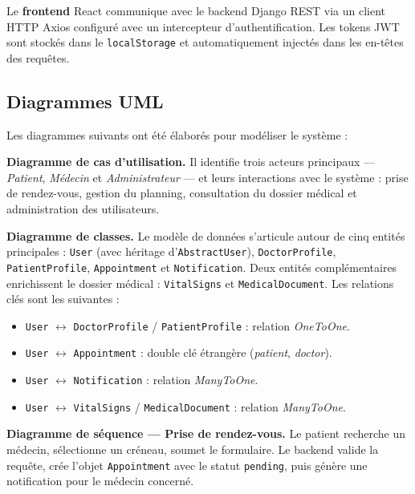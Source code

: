 \documentclass[12pt, a4paper]{article}
\begin{document}
Le \textbf{frontend} React communique avec le backend Django REST via un client HTTP Axios configuré avec un intercepteur d'authentification. Les tokens JWT sont stockés dans le \texttt{localStorage} et automatiquement injectés dans les en-têtes des requêtes.

\subsection{Diagrammes UML}

Les diagrammes suivants ont été élaborés pour modéliser le système :

\textbf{Diagramme de cas d'utilisation.} Il identifie trois acteurs principaux — \textit{Patient}, \textit{Médecin} et \textit{Administrateur} — et leurs interactions avec le système : prise de rendez-vous, gestion du planning, consultation du dossier médical et administration des utilisateurs.

\textbf{Diagramme de classes.} Le modèle de données s'articule autour de cinq entités principales : \texttt{User} (avec héritage d'\texttt{AbstractUser}), \texttt{DoctorProfile}, \texttt{PatientProfile}, \texttt{Appointment} et \texttt{Notification}. Deux entités complémentaires enrichissent le dossier médical : \texttt{VitalSigns} et \texttt{MedicalDocument}. Les relations clés sont les suivantes :

\begin{itemize}[nosep]
  \item \texttt{User} $\longleftrightarrow$ \texttt{DoctorProfile} / \texttt{PatientProfile} : relation \textit{OneToOne}.
  \item \texttt{User} $\longleftrightarrow$ \texttt{Appointment} : double clé étrangère (\textit{patient}, \textit{doctor}).
  \item \texttt{User} $\longleftrightarrow$ \texttt{Notification} : relation \textit{ManyToOne}.
  \item \texttt{User} $\longleftrightarrow$ \texttt{VitalSigns} / \texttt{MedicalDocument} : relation \textit{ManyToOne}.
\end{itemize}

\textbf{Diagramme de séquence — Prise de rendez-vous.} Le patient recherche un médecin, sélectionne un créneau, soumet le formulaire. Le backend valide la requête, crée l'objet \texttt{Appointment} avec le statut \texttt{pending}, puis génère une notification pour le médecin concerné.

\end{document}
